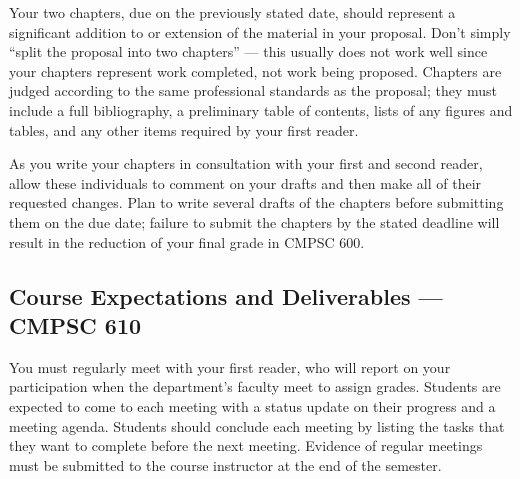 %
%

\medskip
{} Your two chapters, due on the previously stated date, should represent a
significant addition to or extension of the material in your proposal. Don't simply ``split the proposal into two
chapters'' --- this usually does not work well since your chapters represent work completed, not work being proposed.
Chapters are judged according to the same professional standards as the proposal; they must include a full bibliography, a
preliminary table of contents, lists of any figures and tables, and any other items required by your first reader.

As you write your chapters in consultation with your first and second reader, allow these individuals to comment on your
drafts and then make all of their requested changes.  Plan to write several drafts of the chapters before submitting them
on the due date; failure to submit the chapters by the stated deadline will result in the reduction of your final grade
in CMPSC 600.

\vspace*{-.2in}
\subsection*{Course Expectations and Deliverables --- CMPSC 610}

{} You must regularly meet with your first reader, who will report on your participation when
the department's faculty meet to assign grades.  Students are expected to come to each meeting with a status update on
their progress and a meeting agenda.  Students should conclude each meeting by listing the tasks that they want to
complete before the next meeting. Evidence of regular meetings must be submitted to the course instructor at the end
of the semester.

%



